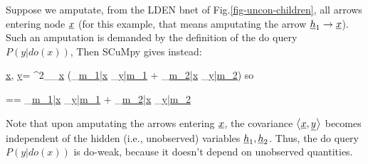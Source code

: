 Suppose we amputate, 
from the LDEN bnet of
Fig.\ref{fig-uncon-children}, all 
arrows entering node $\rvx$
(for this example,
that means amputating the arrow
$\rvh_1\rarrow \rvx$).
Such an amputation is demanded by the definition of
the do query $P(y|do(x))$, 
Then SCuMpy gives instead:

\beq
\left\langle\underline{x}, \underline{y}\right\rangle=
 \sigma^2_{\underline{\epsilon}_{\underline{x}}} \left(\alpha_{\underline{m_1}|\underline{x}} \alpha_{\underline{y}|\underline{m_1}} + \alpha_{\underline{m_2}|\underline{x}} \alpha_{\underline{y}|\underline{m_2}}\right)
\eeq
so

\beq
\pder{\rvx}{\rvy}
=\frac{\av{\rvx, \rvy}}{\av{\rvx, \rvx}}=
\alpha_{\underline{m_1}|\underline{x}} \alpha_{\underline{y}|\underline{m_1}} + \alpha_{\underline{m_2}|\underline{x}} \alpha_{\underline{y}|\underline{m_2}}
\eeq

Note that upon amputating
the arrows entering $\rvx$,
the covariance $\av{\rvx, \rvy}$
becomes independent of the 
hidden (i.e., unobserved)
variables $\rvh_1, \rvh_2$.
Thus, the do query
$P(y|do(x))$ is do-weak,
because it doesn't 
depend on unobserved quantities.



